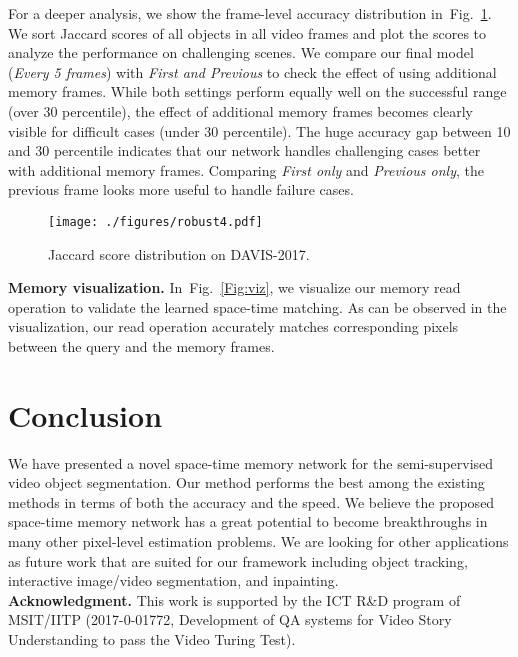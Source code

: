 \documentclass[10pt,twocolumn,letterpaper]{article}
\newcommand{\fref}[1]{Fig.~\ref{#1}}
\renewcommand{\paragraph}[1]{\vspace{1mm}\noindent\textbf{#1}}
\begin{document}
For a deeper analysis, we show the frame-level accuracy distribution in~\fref{Fig:robust}. 
We sort Jaccard scores of all objects in all video frames and plot the scores to analyze the performance on challenging scenes. 
We compare our final model (\textit{Every 5 frames}) with \textit{First and Previous} to check the effect of using additional memory frames.
While both settings perform equally well on the successful range (over 30 percentile), the effect of additional memory frames becomes clearly visible for difficult cases (under 30 percentile). 
The huge accuracy gap between 10 and 30 percentile indicates that our network handles challenging cases better with additional memory frames.
Comparing \textit{First only} and \textit{Previous only}, the previous frame looks more useful to handle failure cases. 


\begin{figure}
\centering
\texttt{[image: ./figures/robust4.pdf]}
\vspace{-5mm}
\caption{Jaccard score distribution on DAVIS-2017.}
\label{Fig:robust}
\end{figure}



\paragraph{Memory visualization.}
In~\fref{Fig:viz}, we visualize our memory read operation to validate the learned space-time matching. 
As can be observed in the visualization, our read operation accurately matches corresponding pixels between the query and the memory frames.


\section{Conclusion}
We have presented a novel space-time memory network for the semi-supervised video object segmentation. 
Our method performs the best among the existing methods in terms of both the accuracy and the speed. 
We believe the proposed space-time memory network has a great potential to become breakthroughs in many other pixel-level estimation problems. 
We are looking for other applications as future work that are suited for our framework including object tracking, interactive image/video segmentation, and inpainting.   \\

\small{
\noindent\textbf{Acknowledgment.} This work is supported by the ICT R\&D program of MSIT/IITP (2017-0-01772, Development of QA systems for Video Story Understanding to pass the Video Turing Test).
}


{\small


}
\end{document}
